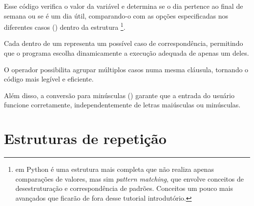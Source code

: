 Esse código verifica o valor da variável  e determina se o dia pertence ao final de semana ou
se é um dia útil, comparando-o com as opções especificadas nos diferentes casos () dentro da estrutura
\footnote{em Python
 é uma estrutura mais completa que não realiza apenas comparações de valores, mas sim
\emph{pattern matching}, que envolve conceitos de desestruturação e correspondência de padrões. Conceitos um pouco mais avançados que ficarão de fora desse tutorial introdutório.}.


Cada  dentro de um  representa um possível caso de correspondência, permitindo que o
programa escolha dinamicamente a execução adequada de apenas um deles.

O operador \inlcode{|} possibilita agrupar múltiplos casos numa mesma cláusula, tornando o código mais legível e eficiente.

Além disso, a conversão para minúsculas () garante que a entrada do usuário funcione corretamente,
independentemente de letras maiúsculas ou minúsculas.



\section{Estruturas de repetição}\label{for}